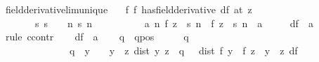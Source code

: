 \begin{isabellebody}
%
\endisatagproof
{\isafoldproof}%
%
\isadelimproof
\isanewline
%
\endisadelimproof
\isanewline
{}\isamarkupfalse%
\ field{\isacharunderscore}{\kern0pt}derivative{\isacharunderscore}{\kern0pt}lim{\isacharunderscore}{\kern0pt}unique{\isacharcolon}{\kern0pt}\isanewline
\ \ \ f{\isacharcolon}{\kern0pt}\ {\isachardoublequoteopen}{\isacharparenleft}{\kern0pt}f\ has{\isacharunderscore}{\kern0pt}field{\isacharunderscore}{\kern0pt}derivative\ df{\isacharparenright}{\kern0pt}\ {\isacharparenleft}{\kern0pt}at\ z{\isacharparenright}{\kern0pt}{\isachardoublequoteclose}\isanewline
\ \ \ \ \ \ \ s{\isacharcolon}{\kern0pt}\ {\isachardoublequoteopen}s\ {\isasymlonglonglongrightarrow}\ {}{\isachardoublequoteclose}\ \ {\isachardoublequoteopen}{\isasymAnd}n{\isachardot}{\kern0pt}\ s\ n\ {\isasymnoteq}\ {}{\isachardoublequoteclose}\ \isanewline
\ \ \ \ \ \ \ a{\isacharcolon}{\kern0pt}\ {\isachardoublequoteopen}{\isacharparenleft}{\kern0pt}{\isasymlambda}n{\isachardot}{\kern0pt}\ {\isacharparenleft}{\kern0pt}f\ {\isacharparenleft}{\kern0pt}z\ {\isacharplus}{\kern0pt}\ s\ n{\isacharparenright}{\kern0pt}\ {\isacharminus}{\kern0pt}\ f\ z{\isacharparenright}{\kern0pt}\ {\isacharslash}{\kern0pt}\ s\ n{\isacharparenright}{\kern0pt}\ {\isasymlonglonglongrightarrow}\ a{\isachardoublequoteclose}\isanewline
\ \ \ \ \ {\isachardoublequoteopen}df\ {\isacharequal}{\kern0pt}\ a{\isachardoublequoteclose}\isanewline
%
\isadelimproof
%
\endisadelimproof
%
\isatagproof
{}\isamarkupfalse%
\ {\isacharparenleft}{\kern0pt}rule\ ccontr{\isacharparenright}{\kern0pt}\isanewline
\ \ \isamarkupfalse%
\ {\isachardoublequoteopen}df\ {\isasymnoteq}\ a{\isachardoublequoteclose}\isanewline
\ \ \isamarkupfalse%
\ q\ \ qpos{\isacharcolon}{\kern0pt}\ {\isachardoublequoteopen}{\isasymAnd}{\isasymepsilon}{\isachardot}{\kern0pt}\ {\isasymepsilon}\ {\isachargreater}{\kern0pt}\ {}\ {\isasymLongrightarrow}\ q\ {\isasymepsilon}\ {\isachargreater}{\kern0pt}\ {}{\isachardoublequoteclose}\ \isanewline
\ \ \ \ \ \ \ \ \ \ \ \ \ \ q{\isacharcolon}{\kern0pt}\ {\isachardoublequoteopen}{\isasymAnd}{\isasymepsilon}\ y{\isachardot}{\kern0pt}\ {\isasymlbrakk}{\isasymepsilon}\ {\isachargreater}{\kern0pt}\ {}{\isacharsemicolon}{\kern0pt}\ y\ {\isasymnoteq}\ z{\isacharsemicolon}{\kern0pt}\ dist\ y\ z\ {\isacharless}{\kern0pt}\ q\ {\isasymepsilon}{\isasymrbrakk}\ {\isasymLongrightarrow}\ dist\ {\isacharparenleft}{\kern0pt}{\isacharparenleft}{\kern0pt}f\ y\ {\isacharminus}{\kern0pt}\ f\ z{\isacharparenright}{\kern0pt}\ {\isacharslash}{\kern0pt}\ {\isacharparenleft}{\kern0pt}y\ {\isacharminus}{\kern0pt}\ z{\isacharparenright}{\kern0pt}{\isacharparenright}{\kern0pt}\ df\ {\isacharless}{\kern0pt}\ {\isasymepsilon}{\isachardoublequoteclose}\isanewline

\end{isabellebody}
